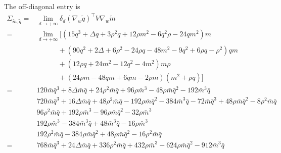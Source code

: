 The off-diagonal entry is
\[\begin{split}
 \Sigma_{\tilde m, \tilde q} =&  \lim_{d\to+\infty} \delta_d (\nabla_w{\tilde q})^\top V \nabla_w{\tilde m}  \\ 
 =& \lim_{d\to+\infty}\Big[(15q^3+\Delta q+3\rho^2q+12\rho m^2-6q^2\rho-24qm^2)m \\
 &\qquad\quad + (90q^2+2\Delta+6\rho^2-24\rho q -48m^2-9q^2+6\rho q-\rho^2)qm \\
 &\qquad\quad +(12\rho q + 24m^2-12q^2-4m^2)m\rho \\
 &\qquad\quad +(24\rho m-48qm+6qm-2\rho m)(m^2+\rho q) \Big] \\
 =& 120\bar m \bar q^3+8\Delta \bar m \bar q+24\rho^2\bar m \bar q+96 \rho \bar m^3-48\rho\bar m \bar q^2-192\bar m^3 \bar q \\
  & 720\bar m \bar q^3+16\Delta \bar m \bar q + 48\rho^2 \bar m \bar q -192\rho\bar m \bar q^2 -384\bar m^3 \bar q -72 \bar m \bar q^3 + 48 \rho \bar m \bar q^2 -8 \rho^2 \bar m \bar q \\
  & 96 \rho^2 \bar m \bar q + 192 \rho \bar m^3 -96 \rho \bar m \bar q^2 -32 \rho \bar m^3 \\
  & 192\rho \bar m^3-384 \bar m^3\bar q + 48 \bar m^3\bar q-16\rho \bar m^3 \\
  & 192\rho^2 \bar m \bar q-384 \rho \bar m \bar q^2 + 48 \rho \bar m \bar q^2 -16\rho^2 \bar m \bar q \\
 =& 768\bar m \bar q^3+24\Delta \bar m \bar q+336\rho^2\bar m \bar q+432 \rho \bar m^3-624\rho\bar m \bar q^2-912\bar m^3 \bar q 
\end{split}\]

